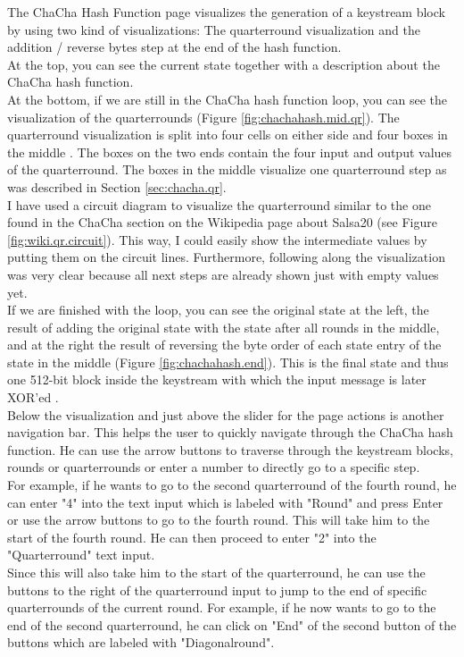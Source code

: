 The ChaCha Hash Function page visualizes the generation of a keystream block by using two kind of visualizations: The quarterround visualization  and the addition / reverse bytes step at the end of the hash function. \\
At the top, you can see the current state together with a description about the ChaCha hash function.\\
At the bottom, if we are still in the ChaCha hash function loop, you can see the visualization of the quarterrounds (Figure \ref{fig:chachahash.mid.qr}). The quarterround visualization is split into four cells on either side and four boxes in the middle . The boxes on the two ends contain the four input and output values of the quarterround. The boxes in the middle visualize one quarterround step as was described in Section \ref{sec:chacha.qr}. \\
I have used a circuit diagram to visualize the quarterround similar to the one found in the ChaCha section on the Wikipedia page about Salsa20 (see Figure \ref{fig:wiki.qr.circuit}). This way, I could easily show the intermediate values by putting them on the circuit lines. Furthermore, following along the visualization was very clear because all next steps are already shown just with empty values yet. \\
If we are finished with the loop, you can see the original state at the left, the result of adding the original state with the state after all rounds in the middle, and at the right the result of reversing the byte order of each state entry of the state in the middle (Figure \ref{fig:chachahash.end}). This is the final state and thus one 512-bit block inside the keystream with which the input message is later XOR'ed . \\
Below the visualization and just above the slider for the page actions is another navigation bar. This helps the user to quickly navigate through the ChaCha hash function. He can use the arrow buttons to traverse through the keystream blocks, rounds or quarterrounds or enter a number to directly go to a specific step. \\
For example, if he wants to go to the second quarterround of the fourth round, he can enter "4" into the text input which is labeled with "Round" and press Enter or use the arrow buttons to go to the fourth round. This will take him to the start of the fourth round. He can then proceed to enter "2" into the "Quarterround" text input. \\
Since this will also take him to the start of the quarterround, he can use the buttons to the right of the quarterround input to jump to the end of specific quarterrounds of the current round. For example, if he now wants to go to the end of the second quarterround, he can click on "End" of the second button of the buttons which are labeled with "Diagonalround". \\
